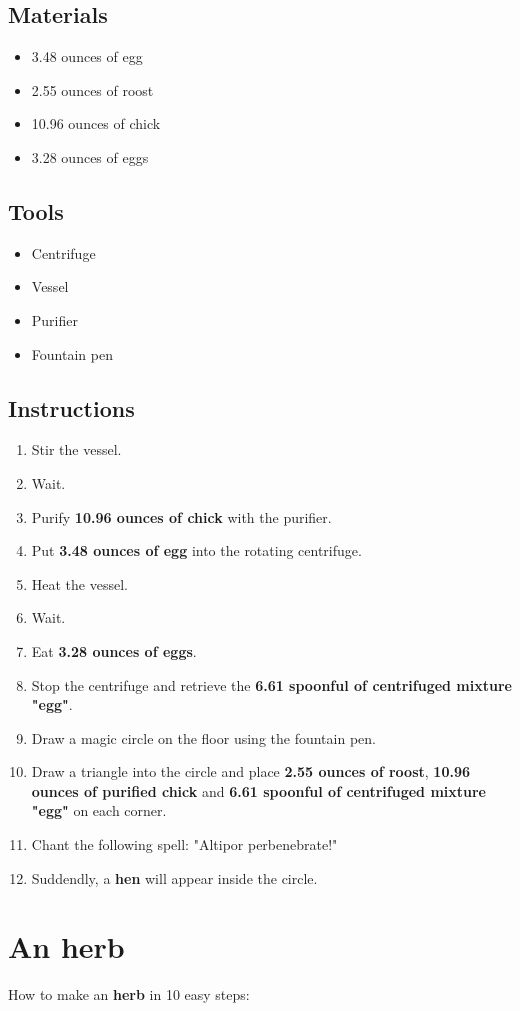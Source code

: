 \documentclass{article}
\begin{document}
\subsection{Materials}\begin{itemize}
\item 
3.48 ounces of egg
\item 
2.55 ounces of roost
\item 
10.96 ounces of chick
\item 
3.28 ounces of eggs
\end{itemize}
\subsection{Tools}\begin{itemize}
\item 
Centrifuge
\item 
Vessel
\item 
Purifier
\item 
Fountain pen
\end{itemize}
\subsection{Instructions}\begin{enumerate}
\item 
Stir the vessel.
\item 
Wait.
\item 
Purify \textbf{10.96 ounces of chick} with the purifier.
\item 
Put \textbf{3.48 ounces of egg} into the rotating centrifuge.
\item 
Heat the vessel.
\item 
Wait.
\item 
Eat \textbf{3.28 ounces of eggs}.
\item 
Stop the centrifuge and retrieve the \textbf{6.61 spoonful of centrifuged mixture "egg"}.
\item 
Draw a magic circle on the floor using the fountain pen.
\item 
Draw a triangle into the circle and place \textbf{2.55 ounces of roost}, \textbf{10.96 ounces of purified chick} and \textbf{6.61 spoonful of centrifuged mixture "egg"} on each corner.
\item 
Chant the following spell: "Altipor perbenebrate!"
\item 
Suddendly, a \textbf{hen} will appear inside the circle.
\end{enumerate}
\newpage
\section{An herb}How to make an \textbf{herb} in 10 easy steps:
\end{document}
